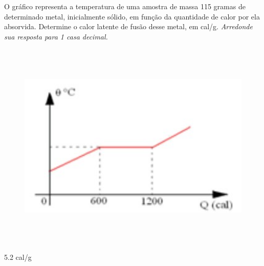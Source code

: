 \usepackage[portuguese]{babel}
\usepackage{graphicx}

\begin{question}
 
O gráfico representa a temperatura de uma amostra de massa 115 gramas de determinado metal, inicialmente sólido, em função da quantidade de calor por ela absorvida. Determine o calor latente de fusão desse metal, em cal/g. \textit{Arredonde sua resposta para 1 casa decimal.}

\begin{figure}
  \includegraphics[height=10cm]{../../figuras/Q15CalL.jpg}
\end{figure}

\end{question}

\begin{solution}
  
  5.2 cal/g
  
\end{solution}


